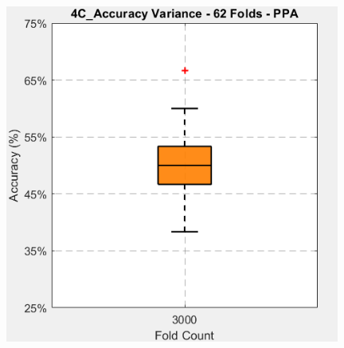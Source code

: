 \begin{frame}
\begin{columns}
		\begin{column}{0.49\textwidth}
			\begin{itemize}
			\end{itemize}
			\begin{figure}
				\centering
				\includegraphics[width=0.98\textwidth]{assets/box_4C_62_ppa.png}
			\end{figure}
		\end{column}
	\end{columns}
\end{frame}


